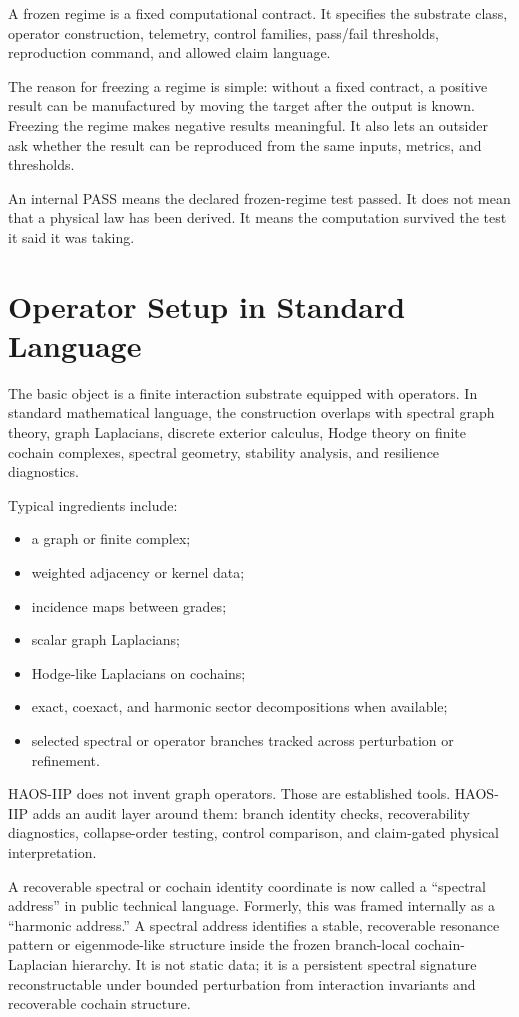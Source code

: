 \documentclass[11pt]{article}
\begin{document}
A frozen regime is a fixed computational contract. It specifies the substrate class, operator construction, telemetry, control families, pass/fail thresholds, reproduction command, and allowed claim language.

The reason for freezing a regime is simple: without a fixed contract, a positive result can be manufactured by moving the target after the output is known. Freezing the regime makes negative results meaningful. It also lets an outsider ask whether the result can be reproduced from the same inputs, metrics, and thresholds.

An internal PASS means the declared frozen-regime test passed. It does not mean that a physical law has been derived. It means the computation survived the test it said it was taking.

\section{Operator Setup in Standard Language}

The basic object is a finite interaction substrate equipped with operators. In standard mathematical language, the construction overlaps with spectral graph theory, graph Laplacians, discrete exterior calculus, Hodge theory on finite cochain complexes, spectral geometry, stability analysis, and resilience diagnostics.

Typical ingredients include:

\begin{itemize}
\item a graph or finite complex;
\item weighted adjacency or kernel data;
\item incidence maps between grades;
\item scalar graph Laplacians;
\item Hodge-like Laplacians on cochains;
\item exact, coexact, and harmonic sector decompositions when available;
\item selected spectral or operator branches tracked across perturbation or refinement.
\end{itemize}

HAOS-IIP does not invent graph operators. Those are established tools. HAOS-IIP adds an audit layer around them: branch identity checks, recoverability diagnostics, collapse-order testing, control comparison, and claim-gated physical interpretation.

A recoverable spectral or cochain identity coordinate is now called a ``spectral address'' in public technical language. Formerly, this was framed internally as a ``harmonic address.'' A spectral address identifies a stable, recoverable resonance pattern or eigenmode-like structure inside the frozen branch-local cochain-Laplacian hierarchy. It is not static data; it is a persistent spectral signature reconstructable under bounded perturbation from interaction invariants and recoverable cochain structure.
\end{document}
